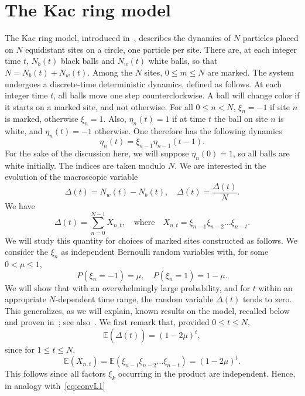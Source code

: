 \documentclass{article}
\newcommand {\E}{\mathbb{E}}
\numberwithin{equation}{section}
\begin{document}
\section{The Kac ring model}\label{s:Kacring}
The Kac ring model, introduced in~\cite{Ka59}, describes the dynamics of $N$ particles placed on $N$ equidistant sites on a circle, one particle per site. There are, at each integer time $t$, $N_b(t)$ black balls and $N_w(t)$ white balls, so that $N=N_b(t)+N_w(t)$. Among the $N$ sites, $0\leq m\leq N$ are marked. The system undergoes a discrete-time deterministic dynamics, defined as follows. At each integer time $t$, all balls move one step counterclockwise. A ball will change color if it starts on a marked site, and not otherwise. For all $0\leq n<N$, $\xi_n=-1$ if site $n$ is marked, otherwise $\xi_n=1$. Also, $\eta_n(t)=1$ if at time $t$ the ball on site $n$ is white, and $\eta_n(t)=-1$ otherwise. One therefore has the following dynamics
$$
\eta_n(t)=\xi_{n-1}\eta_{n-1}(t-1).
$$
For the sake of the discussion here, we will suppose $\eta_n(0)=1$, so all balls are white initially. The indices are taken modulo $N$.
We are interested in the evolution of the macroscopic variable
$$
\Delta(t)=N_w(t)-N_b(t), \quad \overline{\Delta(t)}=\frac{\Delta(t)}{N}.
$$
We have
\begin{equation}\label{eq:Xndef}
\Delta(t)=\sum_{n=0}^{N-1} X_{n,t}, \quad\mathrm{where}\quad X_{n,t}=\xi_{n-1}\xi_{n-2}\dots \xi_{n-t}.
\end{equation}
We will study this quantity for choices of marked sites constructed as follows. We consider the $\xi_n$ as independent Bernoulli random variables
with, for some $0<\mu\leq 1$,
\begin{equation}
P(\xi_n=-1)=\mu,\quad P(\xi_n=1)=1-\mu.
\end{equation}
We will show that with an overwhelmingly large probability, and for $t$ within an appropriate $N$-dependent time range, the random variable $\Delta(t)$ tends to zero. This generalizes, as we will explain, known results on the model, recalled below and proven in~\cite{Ka59}; see also~\cite{GoOl09}. We first remark that, provided $0\leq t\leq N$,
$$
\E(\overline{\Delta(t)})=(1-2\mu)^t,
$$
since for $1\leq t\leq N$,
\begin{equation}\label{eq:Xnexpected}
\E(X_{n,t})=\E(\xi_{n-1}\xi_{n-2}\dots \xi_{n-t})=(1-2\mu)^t.
\end{equation}
This follows since all factors $\xi_k$ occurring in the product are independent. Hence, in analogy with~\eqref{eq:convL1}
\end{document}
